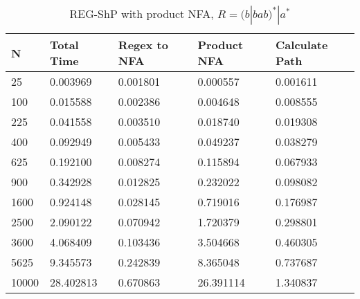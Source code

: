 \documentclass[]{article}
\numberwithin{equation}{section}
\begin{document}
\begin{appendices}
\begin{table}[H]
	\centering
	\small
	\setlength\tabcolsep{2pt}
	\begin{tabular}{|l|l|l|l|l|}
		\hline
		N     & Total Time & Regex to NFA & Product NFA & Calculate Path \\ \hline
		25    & 0.003969   & 0.001801     & 0.000557    & 0.001611       \\ \hline
		100   & 0.015588   & 0.002386     & 0.004648    & 0.008555       \\ \hline
		225   & 0.041558   & 0.003510     & 0.018740    & 0.019308       \\ \hline
		400   & 0.092949   & 0.005433     & 0.049237    & 0.038279       \\ \hline
		625   & 0.192100   & 0.008274     & 0.115894    & 0.067933       \\ \hline
		900   & 0.342928   & 0.012825     & 0.232022    & 0.098082       \\ \hline
		1600  & 0.924148   & 0.028145     & 0.719016    & 0.176987       \\ \hline
		2500  & 2.090122   & 0.070942     & 1.720379    & 0.298801       \\ \hline
		3600  & 4.068409   & 0.103436     & 3.504668    & 0.460305       \\ \hline
		5625  & 9.345573   & 0.242839     & 8.365048    & 0.737687       \\ \hline
		10000 & 28.402813  & 0.670863     & 26.391114   & 1.340837       \\ \hline
	\end{tabular}
	\caption{REG-ShP with product NFA, $R = (b|bab)^*|a^*$}
\end{table}


\end{appendices}
\end{document}
